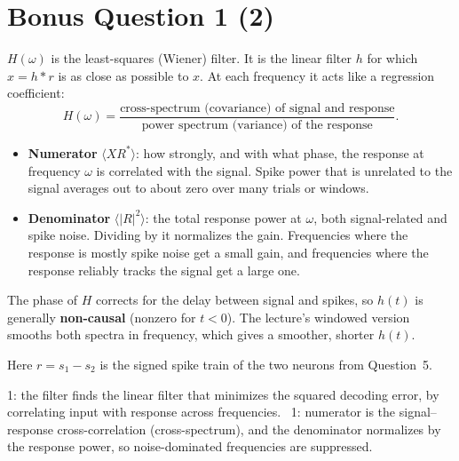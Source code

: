 \documentclass[11pt,letterpaper]{article}
\begin{document}
\section*{Bonus Question 1 \hfill (2)}
$H(\omega)$ is the least-squares (Wiener) filter. It is the linear filter $h$ for which $\hat x = h * r$ is as close as possible to $x$. At each frequency it acts like a regression coefficient:
\[
H(\omega) = \frac{\text{cross-spectrum (covariance) of signal and response}}{\text{power spectrum (variance) of the response}}.
\]
\begin{itemize}[leftmargin=1.2em]
\item \textbf{Numerator} $\langle X R^*\rangle$: how strongly, and with what phase, the response at frequency $\omega$ is correlated with the signal. Spike power that is unrelated to the signal averages out to about zero over many trials or windows.
\item \textbf{Denominator} $\langle |R|^2\rangle$: the total response power at $\omega$, both signal-related and spike noise. Dividing by it normalizes the gain. Frequencies where the response is mostly spike noise get a small gain, and frequencies where the response reliably tracks the signal get a large one.
\end{itemize}
The phase of $H$ corrects for the delay between signal and spikes, so $h(t)$ is generally \textbf{non-causal} (nonzero for $t < 0$). The lecture's windowed version smooths both spectra in frequency, which gives a smoother, shorter $h(t)$.
\begin{center}
\end{center}
Here $r = s_1 - s_2$ is the signed spike train of the two neurons from Question~5.
\begin{marking}
1: the filter finds the linear filter that minimizes the squared decoding error, by correlating input with response across frequencies. \ 1: numerator is the signal--response cross-correlation (cross-spectrum), and the denominator normalizes by the response power, so noise-dominated frequencies are suppressed.
\end{marking}
\end{document}
